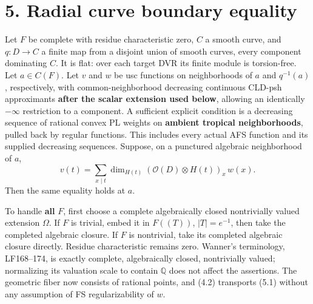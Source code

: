 \documentclass[
  10pt,
]{article}
\begin{document}
\section{5. Radial curve boundary
equality}\label{radial-curve-boundary-equality}

Let \(F\) be complete with residue characteristic zero, \(C\) a smooth
curve, and \(q:D\to C\) a finite map from a disjoint union of smooth
curves, every component dominating \(C\). It is flat: over each target
DVR its finite module is torsion-free. Let \(a\in C(F)\). Let \(v\) and
\(w\) be usc functions on neighborhoods of \(a\) and \(q^{-1}(a)\),
respectively, with common-neighborhood decreasing continuous CLD-psh
approximants \textbf{after the scalar extension used below}, allowing an
identically \(-\infty\) restriction to a component. A sufficient
explicit condition is a decreasing sequence of rational convex PL
weights on \textbf{ambient tropical neighborhoods}, pulled back by
regular functions. This includes every actual AFS function and its
supplied decreasing sequences. Suppose, on a punctured algebraic
neighborhood of \(a\),
\[v(t)=\sum_{x\mid t}\dim_{H(t)}(\mathcal O(D)\otimes H(t))_x\,w(x).\tag{5.1}\]
Then the same equality holds at \(a\).

To handle \textbf{all} \(F\), first choose a complete algebraically
closed nontrivially valued extension \(\Omega\). If \(F\) is trivial,
embed it in \(F((T))\), \(|T|=e^{-1}\), then take the completed
algebraic closure. If \(F\) is nontrivial, take its completed algebraic
closure directly. Residue characteristic remains zero. Wanner's
terminology, LF168--174, is exactly complete, algebraically closed,
nontrivially valued; normalizing its valuation scale to contain
\(\mathbb Q\) does not affect the assertions. The geometric fiber now
consists of rational points, and (4.2) transports (5.1) without any
assumption of FS regularizability of \(w\).
\end{document}
